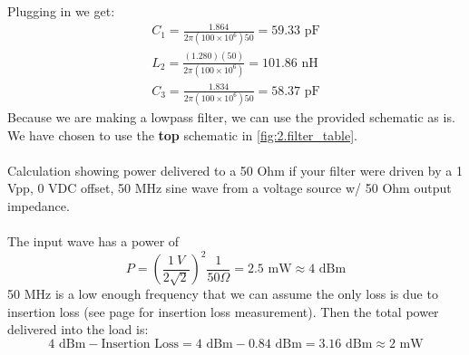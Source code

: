 \documentclass[letterpaper,12pt]{article}
\begin{document}
\noindent
Plugging in we get:
\begin{align*}
    C_1 = \frac{1.864}{2\pi(100\times10^6)50} = 59.33 \text{ pF} \\
    L_2 = \frac{(1.280)(50)}{2\pi(100\times10^6)} = 101.86 \text{ nH} \\
    C_3 = \frac{1.834}{2\pi(100\times10^6)50} = 58.37 \text{ pF}
\end{align*}
Because we are making a lowpass filter, we can use the provided schematic as is. We have chosen to use the \textbf{top} schematic in \ref{fig:2.filter_table}. \\
\\
Calculation showing power delivered to a 50 Ohm if your filter were driven by a 1 Vpp, 0 VDC offset, 50 MHz sine wave from a voltage source w/ 50 Ohm output impedance.\\
\\
The input wave has a power of
$$P=\left(\frac{1 \ V}{2\sqrt{2}}\right)^2 \frac{1}{50 \Omega} = 2.5 \text{ mW} \approx 4 \text{ dBm}$$
50 MHz is a low enough frequency that we can assume the only loss is due to insertion loss (see page \pageref{sec:s21_dcstop} for insertion loss measurement).
Then the total power delivered into the load is:
$$4 \text{ dBm} - \text{Insertion Loss} = 4 \text{ dBm} - 0.84 \text{ dBm} = 3.16 \text{ dBm} \approx 2 \text{ mW} $$

\newpage
\end{document}
